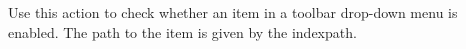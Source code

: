 Use this action to check whether an item in a toolbar drop-down menu is enabled. The path to the item is given by the indexpath. 
